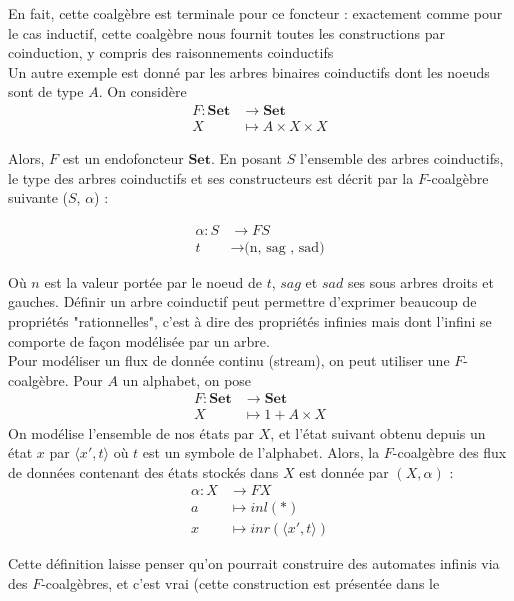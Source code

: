 \documentclass{article}
\begin{document}
En fait, cette coalgèbre est terminale pour ce foncteur : exactement comme pour le cas inductif, cette coalgèbre nous fournit toutes les constructions par coinduction, y compris des raisonnements coinductifs
\\
Un autre exemple est donné par les arbres binaires coinductifs dont les noeuds sont de type $A$. On considère 
\begin{align*}
    F : \mathbf{Set} & \rightarrow \mathbf{Set} \\      X & \mapsto A \times X \times X    
\end{align*}

Alors, $F$ est un endofoncteur $\mathbf{Set}$. En posant $S$ l'ensemble des arbres coinductifs, le type des arbres coinductifs et ses constructeurs est décrit par la $F$-coalgèbre suivante ($S$,
 $\alpha$) :

 \begin{align*}
    \alpha : S &\rightarrow F S \\ 
             t &\rightarrow \text{(n, sag , sad)} 
\end{align*}

Où $n$ est la valeur portée par le noeud de $t$, $sag$ et $sad$ ses sous arbres droits et gauches. Définir un arbre coinductif peut permettre d'exprimer beaucoup de propriétés "rationnelles", c'est à dire des propriétés infinies mais dont l'infini se comporte de façon modélisée par un arbre.
\\

Pour modéliser un flux de donnée continu (stream), on peut utiliser une $F$-coalgèbre. Pour $A$ un alphabet,  on pose
\begin{align*}
    F : \mathbf{Set} & \rightarrow \mathbf{Set} \\ 
        X & \mapsto 1 + A \times X
\end{align*}
On modélise l'ensemble de nos états par $X$, et l'état suivant obtenu depuis un état $x$ par $\langle x', t \rangle $ où $t$ est un symbole de l'alphabet.
Alors, la $F$-coalgèbre des flux de données contenant des états stockés dans $X$  est donnée par $(X,\alpha)$  : 
\begin{align*}
    \alpha : X & \rightarrow FX \\ 
             a & \mapsto inl(*) \\
             x & \mapsto inr(\langle x', t \rangle)
\end{align*}

Cette définition laisse penser qu'on pourrait construire des automates infinis via des $F$-coalgèbres, et c'est vrai (cette construction est présentée dans le \cite{Jacobs}
\end{document}
